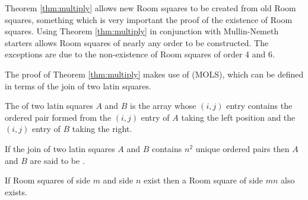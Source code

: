 Theorem \ref{thm:multiply} allows new Room squares to be created from old Room squares, something which is very important the proof of the existence of Room squares.
Using Theorem \ref{thm:multiply} in conjunction with Mullin-Nemeth starters allows Room squares of nearly any order to be constructed.
The exceptions are due to the non-existence of Room squares of order 4 and 6.

The proof of Theorem \ref{thm:multiply} makes use of  (MOLS), which can be defined in terms of the join of two latin squares.

The  of two latin squares $A$ and $B$ is the array whose $(i, j)$ entry contains the ordered pair formed from the $(i, j)$ entry of $A$ taking the left position and the $(i, j)$ entry of $B$ taking the right.

If the join of two latin squares $A$ and $B$ contains $n^{2}$ unique ordered pairs then $A$ and $B$ are said to be .

\begin{theorem}
\label{thm:multiply}
If Room squares of side $m$ and side $n$ exist then a Room square of side $mn$ also exists.
\end{theorem}

